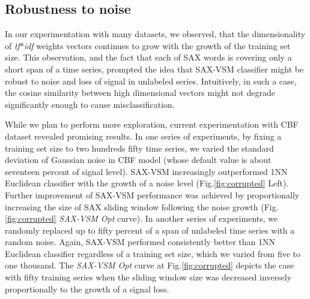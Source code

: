 \documentclass{llncs}
\begin{document}
\subsection{Robustness to noise}
In our experimentation with many datasets, we observed, that the dimensionality of \textit{tf$\ast$idf} 
weights vectors continues to grow with the growth of the training set size. 
This observation, and the fact that each of SAX words is covering only a short span of a time 
series, prompted the idea that SAX-VSM classifier might be robust to noise and loss of signal 
in unlabeled series. Intuitively, in such a case, the cosine similarity between high dimensional 
vectors might not degrade significantly enough to cause misclassification.

While we plan to perform more exploration, current experimentation with CBF dataset revealed 
promising results. 
In one series of experiments, by fixing a training set size to two hundreds fifty time series, we
varied the standard deviation of Gaussian noise in CBF model (whose default value is about 
seventeen percent of signal level). SAX-VSM increasingly outperformed 1NN Euclidean classifier 
with the growth of a noise level (Fig.\ref{fig:corrupted} Left). 
Further improvement of SAX-VSM performance was achieved by proportionally increasing
the size of SAX sliding window following the noise growth (Fig.\ref{fig:corrupted}
\textit{SAX-VSM Opt} curve). 
In another series of experiments, we randomly replaced up to fifty percent of a span of unlabeled
time series with a random noise. Again, SAX-VSM performed consistently better than 
1NN Euclidean classifier regardless of a training set size, which we varied from five to
one thousand. The \textit{SAX-VSM Opt} curve at Fig.\ref{fig:corrupted} depicts the case
with fifty training series when the sliding window size was decreased inversely proportionally 
to the growth of a signal loss.
\end{document}
